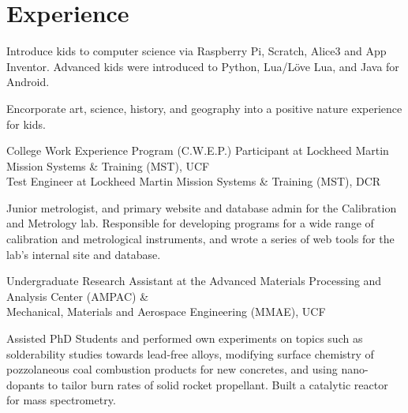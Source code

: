 \documentclass[]{resume-openfont}
\begin{document}
\begin{minipage}[t]{0.65\textwidth}

\section{Experience}
\vspace{\topsep}
\begin{tightemize}
\item Introduce kids to computer science via Raspberry Pi, Scratch, Alice3 and App Inventor. Advanced kids were introduced to Python, Lua/Löve Lua, and Java for Android.
\end{tightemize}
\begin{tightemize}
\item Encorporate art, science, history, and geography into a positive nature experience for kids.
\end{tightemize}
\sectionsep

College Work Experience Program (C.W.E.P.) Participant at Lockheed Martin Mission Systems \& Training (MST), UCF\\
Test Engineer at Lockheed Martin Mission Systems \& Training (MST), DCR\\
\begin{tightemize}
\item Junior  metrologist,  and  primary  website  and  database  admin  for  the Calibration and Metrology lab. Responsible for developing programs for a wide range of calibration and metrological instruments, and wrote a series of web tools for the lab’s internal site and database.
\end{tightemize}
\sectionsep

Undergraduate Research Assistant at the Advanced Materials Processing and Analysis Center (AMPAC) \&\\
Mechanical, Materials and Aerospace Engineering (MMAE), UCF\\
\begin{tightemize}
\item Assisted  PhD  Students  and  performed  own  experiments  on  topics  such  as solderability studies towards lead-free alloys, modifying surface chemistry of pozzolaneous coal combustion products for new concretes, and using nano-dopants to tailor burn rates of solid rocket propellant. Built a catalytic reactor for mass spectrometry.
\end{tightemize}
\sectionsep


\end{minipage}
\end{document}
